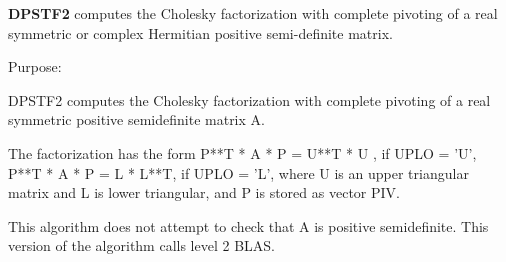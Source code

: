 {\bfseries D\+P\+S\+T\+F2} computes the Cholesky factorization with complete pivoting of a real symmetric or complex Hermitian positive semi-\/definite matrix. 

 \begin{DoxyParagraph}{Purpose\+: }
\begin{DoxyVerb} DPSTF2 computes the Cholesky factorization with complete
 pivoting of a real symmetric positive semidefinite matrix A.

 The factorization has the form
    P**T * A * P = U**T * U ,  if UPLO = 'U',
    P**T * A * P = L  * L**T,  if UPLO = 'L',
 where U is an upper triangular matrix and L is lower triangular, and
 P is stored as vector PIV.

 This algorithm does not attempt to check that A is positive
 semidefinite. This version of the algorithm calls level 2 BLAS.\end{DoxyVerb}
 
\end{DoxyParagraph}

